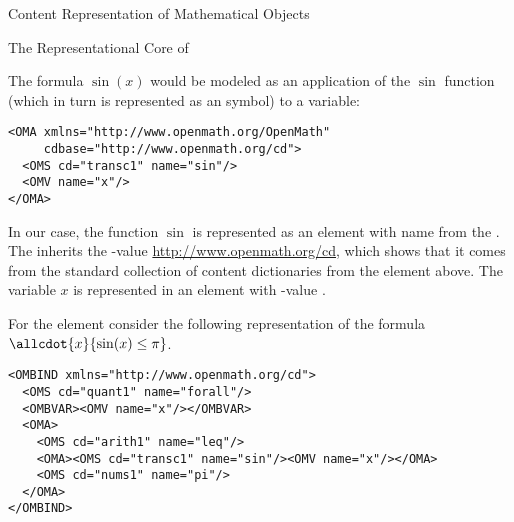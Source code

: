 \begin{omgroup}[id=mobj,short=Mathematical Objects]
\begin{omgroup}[id=mobj.core]{Content Representation of Mathematical Objects}
\begin{module}[id=OpenMath]
\begin{omgroup}[id=openmath]{The Representational Core of \openmath}
\begin{example}
  The formula $\sin(x)$ would be modeled as an application of the $\sin$ function (which
  in turn is represented as an {\openmath} symbol) to a variable:
\begin{lstlisting}[label=sinx,language=OpenMath,numbers=none,index={OMA,OMV,OMS}]
<OMA xmlns="http://www.openmath.org/OpenMath"
     cdbase="http://www.openmath.org/cd">
  <OMS cd="transc1" name="sin"/>
  <OMV name="x"/>
</OMA>
\end{lstlisting}
  In our case, the function $\sin$ is represented as an  element
  with name {} from the {}
  {}. The  inherits the
  {}-value \url{http://www.openmath.org/cd}, which shows that it
  comes from the {\openmath} standard collection of content dictionaries from the
   element above.  The variable $x$ is represented in an
   element with -value
  {}.
\end{example}

\begin{example}
  For the  element consider the following representation of the
  formula $\allcdot{x}{\sin(x)\leq\pi}$.
\begin{lstlisting}[label=allxsinx,language=OpenMath,numbers=none,
   index={OMA,OMV,OMBIND,OMBVAR}]
<OMBIND xmlns="http://www.openmath.org/cd">
  <OMS cd="quant1" name="forall"/>
  <OMBVAR><OMV name="x"/></OMBVAR>
  <OMA>
    <OMS cd="arith1" name="leq"/>
    <OMA><OMS cd="transc1" name="sin"/><OMV name="x"/></OMA>
    <OMS cd="nums1" name="pi"/>
  </OMA>
</OMBIND>
\end{lstlisting}
\end{example}


\end{omgroup}
\end{module}
\end{omgroup}
\end{omgroup}
